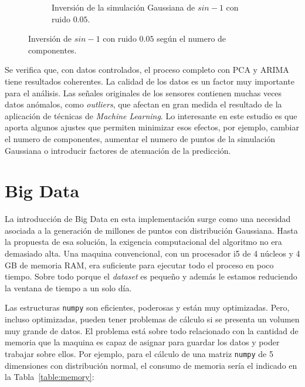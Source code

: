 \documentclass[11pt,spanish,listoffigures,listoftables]{tfgetsinf}
\begin{document}
\begin{figure}[H]
\begin{subfigure}[h]{0.7\textwidth}
                \caption{Inversión de la simulación Gaussiana de \(sin - 1\) con ruido \(0.05\).}
                \label{fig:col5_inverse_gaussian}
            \end{subfigure}
            \caption{Inversión de \(sin - 1\) con ruido \(0.05\) según el numero de componentes.}
            \label{fig:col5_inverted_nipals_n_components}
        \end{figure}
                        
        Se verifica que, con datos controlados, el proceso completo con PCA y ARIMA tiene resultados coherentes. La calidad de los datos es un factor muy importante para el análisis. Las señales originales de los sensores contienen muchas veces datos anómalos, como {\em outliers}, que afectan en gran medida el resultado de la aplicación de técnicas de {\em Machine Learning}. Lo interesante en este estudio es que aporta algunos ajustes que permiten minimizar esos efectos, por ejemplo, cambiar el numero de componentes, aumentar el numero de puntos de la simulación Gaussiana o introducir factores de atenuación de la predicción.
	
	
        \section{Big Data}
        La introducción de Big Data en esta implementación surge como una necesidad asociada a la generación de millones de puntos con distribución Gaussiana. Hasta la propuesta de esa solución, la exigencia computacional del algoritmo no era demasiado alta. Una maquina convencional, con un procesador i5 de 4 núcleos y 4 GB de memoria RAM, era suficiente para ejecutar todo el proceso en poco tiempo. Sobre todo porque el {\em dataset} es pequeño y además le estamos reduciendo la ventana de tiempo a un solo día. 
        
        Las estructuras {\tt numpy} son eficientes, poderosas y están muy optimizadas. Pero, incluso optimizadas, pueden tener problemas de cálculo si se presenta un volumen muy grande de datos. El problema está sobre todo relacionado con la cantidad de memoria que la maquina es capaz de asignar para guardar los datos y poder trabajar sobre ellos. Por ejemplo, para el cálculo de una matriz {\tt numpy} de 5 dimensiones con distribución normal, el consumo de memoria sería el indicado en la Tabla~\ref{table:memory}:
        
\end{document}
